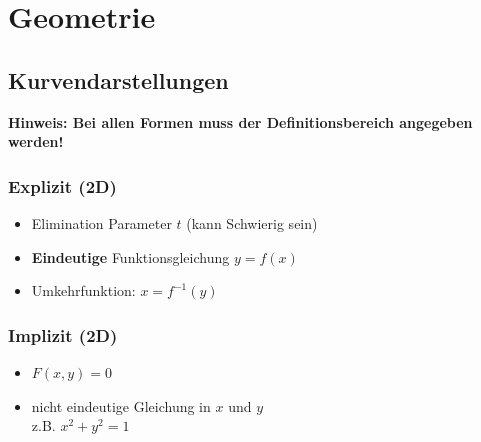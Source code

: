 \section{Geometrie}



\subsection{Kurvendarstellungen}

\textbf{Hinweis: Bei allen Formen muss der Definitionsbereich angegeben werden!}


\begin{minipage}[t]{0.48\columnwidth}
    \subsubsection*{Explizit (2D)}

    \begin{itemize}
        \item Elimination Parameter $t$ (kann Schwierig sein)
        \item \textbf{Eindeutige} Funktionsgleichung $y = f(x)$
        \item Umkehrfunktion: $x = f^{-1}(y)$
    \end{itemize}
\end{minipage}
\hfill
\begin{minipage}[t]{0.48\columnwidth}
    \subsubsection*{Implizit (2D)}

    \begin{itemize}
        \item $F(x, y) = 0$
        \item nicht eindeutige Gleichung in $x$ und $y$ \\
            z.B. $x^2 + y^2 = 1$
    \end{itemize}
\end{minipage}

